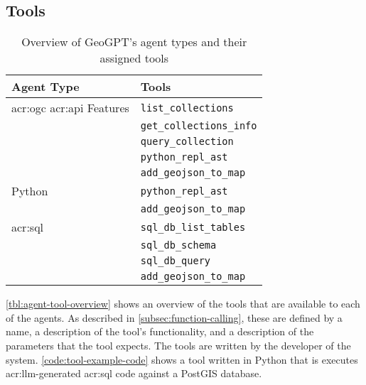 \subsection{Tools}
\label{subsec:tools}

\begin{table}[h]
    \centering
    \caption{Overview of GeoGPT's agent types and their assigned tools}
    \label{tbl:agent-tool-overview}
    \begin{tabularx}{0.7\textwidth}{XX}
        \toprule
        \textbf{Agent Type}                            & \textbf{Tools}                  \\
        \midrule
        \acrshort{acr:ogc} \acrshort{acr:api} Features & \texttt{list\_collections}      \\
                                                       & \texttt{get\_collections\_info} \\
                                                       & \texttt{query\_collection}      \\
                                                       & \texttt{python\_repl\_ast}      \\
                                                       & \texttt{add\_geojson\_to\_map}  \\
        \midrule
        Python                                         & \texttt{python\_repl\_ast}      \\
                                                       & \texttt{add\_geojson\_to\_map}  \\
        \midrule
        \acrshort{acr:sql}                             & \texttt{sql\_db\_list\_tables}  \\
                                                       & \texttt{sql\_db\_schema}        \\
                                                       & \texttt{sql\_db\_query}         \\
                                                       & \texttt{add\_geojson\_to\_map}  \\
        \bottomrule
    \end{tabularx}
\end{table}

\autoref{tbl:agent-tool-overview} shows an overview of the tools that are available to each of the agents. As described in \autoref{subsec:function-calling}, these are defined by a name, a description of the tool's functionality, and a description of the parameters that the tool expects. The tools are written by the developer of the system. \autoref{code:tool-example-code} shows a tool written in Python that is executes \acrshort{acr:llm}-generated \acrshort{acr:sql} code against a PostGIS database.

